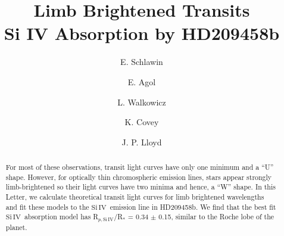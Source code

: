 \documentclass[twocolumn]{emulateapj}
\newcommand{\siIV}{\ensuremath{\mathrm{Si}\,\scriptstyle \mathrm{IV}}}
\begin{document}

\title{Limb Brightened Transits \\
Si IV Absorption by HD209458b}


\author{E. Schlawin} 
\author{E. Agol}
\author{L. Walkowicz}
\author{K. Covey}
\author{J. P. Lloyd}






\begin{abstract}
For most of these observations, transit light curves have only one minimum and a  ``U'' shape. However, for optically thin chromospheric emission lines, stars appear strongly limb-brightened so their light curves have two minima and hence, a ``W'' shape. In this Letter, we calculate theoretical transit light curves for limb brightened wavelengths and fit these models to the \siIV\ emission line in HD209458b. We find that the best fit \siIV\ absorption model has R$_{p,\siIV}$/R$_*$ = 0.34 $\pm$ 0.15, similar to the Roche lobe of the planet.
\end{abstract}
\end{document}
